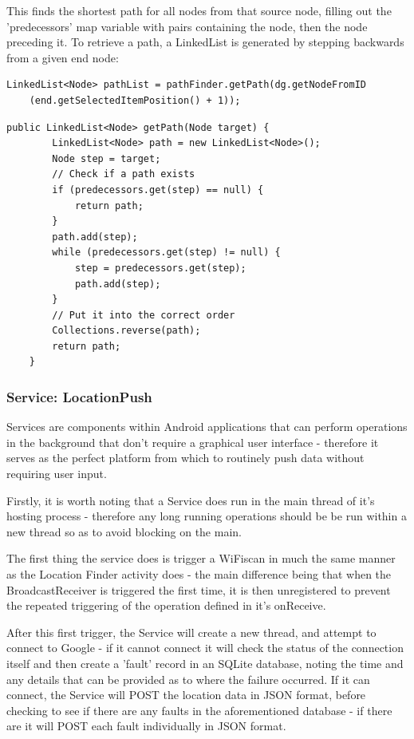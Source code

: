 \documentclass[11pt]{informatics-report}
\begin{document}
This finds the shortest path for all nodes from that source node, filling out the 'predecessors' map variable with pairs containing the node, then the node preceding it. To retrieve a path, a LinkedList is generated by stepping backwards from a given end node:

\begin{verbatim}
LinkedList<Node> pathList = pathFinder.getPath(dg.getNodeFromID
	(end.getSelectedItemPosition() + 1));
\end{verbatim}

\begin{verbatim}
public LinkedList<Node> getPath(Node target) {
        LinkedList<Node> path = new LinkedList<Node>();
        Node step = target;
        // Check if a path exists
        if (predecessors.get(step) == null) {
            return path;
        }
        path.add(step);
        while (predecessors.get(step) != null) {
            step = predecessors.get(step);
            path.add(step);
        }
        // Put it into the correct order
        Collections.reverse(path);
        return path;
    }
\end{verbatim}

\subsubsection{Service: LocationPush}

Services are components within Android applications that can perform operations in the background that don't require a graphical user interface\cite{androidservices} - therefore it serves as the perfect platform from which to routinely push data without requiring user input.

Firstly, it is worth noting that a Service does run in the main thread of it's hosting process - therefore any long running operations should be be run within a new thread so as to avoid blocking on the main.

The first thing the service does is trigger a WiFiscan in much the same manner as the Location Finder activity does - the main difference being that when the BroadcastReceiver is triggered the first time, it is then unregistered to prevent the repeated triggering of the operation defined in it's onReceive.

After this first trigger, the Service will create a new thread, and attempt to connect to Google - if it cannot connect it will check the status of the connection itself and then create a 'fault' record in an SQLite database, noting the time and any details that can be provided as to where the failure occurred. If it can connect, the Service will POST the location data in JSON format, before checking to see if there are any faults in the aforementioned database - if there are it will POST each fault individually in JSON format.
\end{document}
